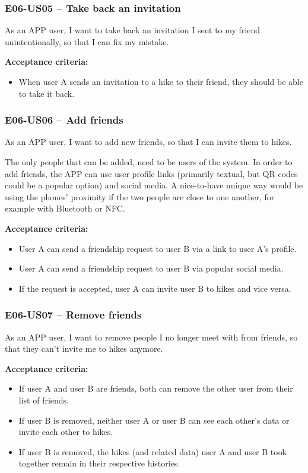 \subsubsection*{E06-US05 -- Take back an invitation}
As an APP user, I want to take back an invitation I sent to my friend unintentionally, so that I can fix my mistake.

\textbf{Acceptance criteria:}
\begin{itemize}
    \item When user A sends an invitation to a hike to their friend, they should be able to take it back.
\end{itemize}


\subsubsection*{E06-US06 -- Add friends}
As an APP user, I want to add new friends, so that I can invite them to hikes.

The only people that can be added, need to be users of the system.
In order to add friends, the APP can use user profile links (primarily textual, but QR codes could be a popular option) and social media.
A nice-to-have unique way would be using the phones' proximity if the two people are close to one another, for example with Bluetooth or NFC.

\textbf{Acceptance criteria:}
\begin{itemize}
    \item User A can send a friendship request to user B via a link to user A's profile.
    \item User A can send a friendship request to user B via popular social media.
    \item If the request is accepted, user A can invite user B to hikes and vice versa.
\end{itemize}

\subsubsection*{E06-US07 -- Remove friends}
As an APP user, I want to remove people I no longer meet with from friends, so that they can't invite me to hikes anymore.

\textbf{Acceptance criteria:}
\begin{itemize}
    \item If user A and user B are friends, both can remove the other user from their list of friends.
    \item If user B is removed, neither user A or user B can see each other's data or invite each other to hikes.
    \item If user B is removed, the hikes (and related data) user A and user B took together remain in their respective histories.
\end{itemize}

